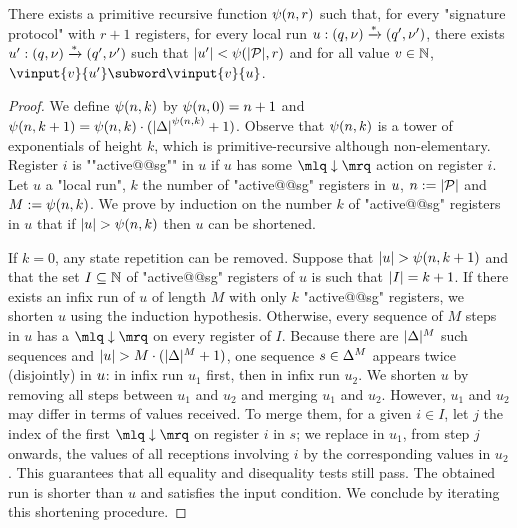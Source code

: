 \begin{lemma}
\label{lem:towerbound_signature}
There exists a primitive recursive function $\psi(n,r)$ such that, for every "signature protocol" with $r+1$ registers, for every local run $u: (q,\nu) \xrightarrow{*} (q', \nu')$, there exists $u' : (q,\nu) \xrightarrow{*} (q',\nu')$ such that $|u'| < \psi(|\mathcal{P}|,r)$ and for all value $v \in \mathbb{N}$,  $\vinput{v}{u'} \subword \vinput{v}{u}$. 
\end{lemma}
\begin{proof}
We define $\psi(n,k)$ by $\psi(n,0) = n+1$ and $\psi(n,k+1) = \psi(n,k) \cdot ({|\Delta|}^{\psi(n,k)}+1)$. Observe that $\psi(n,k)$ is a tower of exponentials of height $k$, which is primitive-recursive although non-elementary. Register $i$ is ""active@@sg"" in $u$ if $u$ has some $\quotemarks{\enregact}$ action on register $i$. Let $u$ a "local run", $k$ the number of "active@@sg" registers in $u$, $n := |\mathcal{P}|$ and $M := \psi(n,k)$.
We prove by induction on the number $k$ of "active@@sg" registers in $u$  that if $|u| >\psi(n,k)$ then $u$ can be shortened. 
 

If $k=0$, any state repetition can be removed. Suppose that $|u| > \psi(n,k+1)$ and that the set $I \subseteq \mathbb{N}$ of "active@@sg" registers of $u$ is such that $|I| = k+1$. If there exists an infix run of $u$ of length $M$ with only $k$ "active@@sg" registers, we shorten $u$ using the induction hypothesis. Otherwise, every sequence of $M$ steps in $u$ has a $\quotemarks{\enregact}$ on every register of $I$. Because there are $|\Delta|^M$ such sequences and $|u| > M \cdot (|\Delta|^M +1)$, one sequence $s \in \Delta^M$ appears twice (disjointly) in $u$: in infix run $u_1$ first, then in infix run $u_2$. We shorten $u$ by removing all steps between $u_1$ and $u_2$ and merging $u_1$ and $u_2$. However, $u_1$ and $u_2$ may differ in terms of values received. To merge them, for a given $i \in I$, let $j$ the index of the first $\quotemarks{\enregact}$ on register $i$ in $s$; we replace in $u_1$, from step $j$ onwards, the values of all receptions involving $i$ by the corresponding values in $u_2$. This guarantees that all equality and disequality tests still pass. The obtained run is shorter than $u$ and satisfies the input condition. We conclude by iterating this shortening procedure.
\end{proof}

